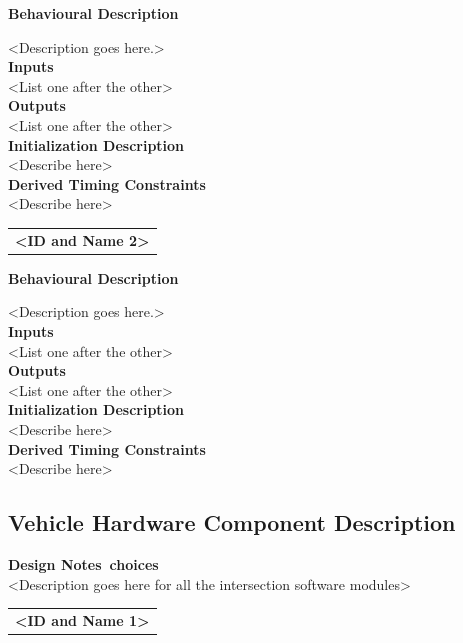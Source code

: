 \documentclass [10pt]{article}
\begin{document}
\textbf{Behavioural Description} 

<Description goes here.> \\

\textbf{Inputs} \\
<List one after the other> \\

\textbf{Outputs} \\
<List one after the other> \\

\textbf{Initialization Description} \\
<Describe here> \\

\textbf{Derived Timing Constraints} \\
<Describe here> \\



\begin{longtable}{p{}}
\rowcolor{tableCell}\textbf{<ID and Name 2>} \\
\end{longtable}

\textbf{Behavioural Description} 

<Description goes here.> \\

\textbf{Inputs} \\
<List one after the other> \\

\textbf{Outputs} \\
<List one after the other> \\

\textbf{Initialization Description} \\
<Describe here> \\

\textbf{Derived Timing Constraints} \\
<Describe here> \\

\subsection{Vehicle Hardware Component Description}

\textbf{Design Notes\ choices} \\
<Description goes here for all the intersection software modules> \\

\begin{longtable}{p{}}
\rowcolor{tableCell}\textbf{<ID and Name 1>} \\
\end{longtable}
\end{document}
